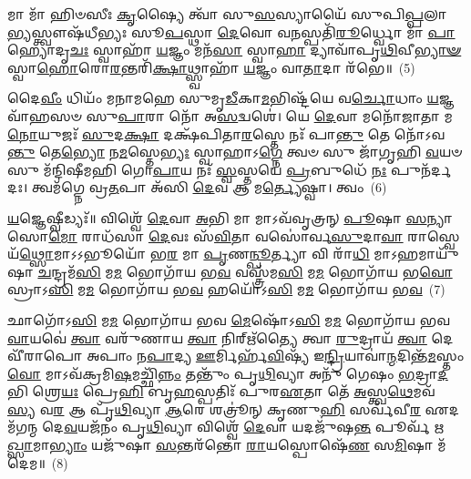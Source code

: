 𑌮𑌾 𑌮𑌾᳴ 𑌹𑌿𑍞𑌸𑍀𑌃 \ul{𑌕𑍃}\-𑌷𑍍𑌯𑍈 𑌤𑍍𑌵𑌾᳴ 𑌸𑍁\-\ul{𑌸}\-𑌸𑍍𑌯𑌾𑌯𑍈᳴ 𑌸𑍁𑌪𑌿\-\ul{𑌪𑍍𑌪}\-𑌲𑌾\-\ul{𑌭𑍍𑌯}\-𑌸𑍍𑌤𑍍𑌵𑍗𑌷᳴\-𑌧𑍀𑌭𑍍𑌯𑌃 𑌸𑍂\-\ul{𑌪}\-𑌸𑍍𑌥𑌾 \ul{𑌦𑍇}\-𑌵𑍋 𑌵\-\ul{𑌨}\-𑌸𑍍𑌪𑌤𑌿᳴\-\ul{𑌰𑍂}\-𑌰𑍍𑌧𑍍𑌵𑍋 𑌮𑌾᳴ \ul{𑌪𑌾}\-𑌹𑍍𑌯𑍋𑌦𑍃\-\ul{𑌚𑌃} 𑌸𑍍𑌵𑌾𑌹𑌾᳴ \ul{𑌯}\-𑌜𑍍𑌞𑌂 𑌮𑌨᳴\-\ul{𑌸𑌾} 𑌸𑍍𑌵𑌾\-\ul{𑌹𑌾} 𑌦𑍍𑌯𑌾𑌵𑌾᳴𑌪𑍃\-\ul{𑌥𑌿}\-𑌵𑍀\-\ul{𑌭𑍍𑌯𑌾}\-\-\ul{𑍟} 𑌸𑍍𑌵𑌾\-\ul{𑌹𑍋}\-𑌰𑍋\-\ul{𑌰}\-𑌨𑍍𑌤𑌰𑌿᳴\-\ul{𑌕𑍍𑌷𑌾}\-𑌥𑍍𑌸𑍍𑌵𑌾𑌹𑌾᳴ \ul{𑌯}\-𑌜𑍍𑌞𑌂 𑌵𑌾\-\ul{𑌤𑌾}\-𑌦𑌾 𑌰᳴𑌭𑍇॥~(5)

{\anuvakamend[{\-\ul{𑌮𑌾} 𑌯𑍋𑌨𑌿᳴𑌰𑌸𑌿 \ul{𑌤𑍍𑌰𑌿}\-\-\ul{𑍞}\-𑌶𑌚𑍍𑌚᳴}]}%

𑌦𑍈\-\ul{𑌵𑍀𑌂} 𑌧𑌿𑌯𑌂᳴ 𑌮𑌨𑌾𑌮𑌹𑍇 𑌸𑍁𑌮𑍃\-\ul{𑌡𑍀}\-𑌕𑌾\-\ul{𑌮}\-𑌭𑌿𑌷𑍍𑌟᳴𑌯𑍇 𑌵\-\ul{𑌰𑍍𑌚𑍋}\-𑌧𑌾𑌂 \ul{𑌯}\-𑌜𑍍𑌞𑌵𑌾᳴𑌹𑌸𑍞 𑌸𑍁\-\ul{𑌪𑌾}\-𑌰𑌾 𑌨𑍋᳴ 𑌅\-\ul{𑌸}\-𑌦𑍍𑌵𑌶𑍇॑। 𑌯𑍇 \ul{𑌦𑍇}\-𑌵𑌾 𑌮𑌨𑍋᳴𑌜𑌾𑌤𑌾 𑌮\-\ul{𑌨𑍋}\-𑌯𑍁𑌜𑌃᳴ \ul{𑌸𑍁}\-𑌦\-\ul{𑌕𑍍𑌷𑌾} 𑌦𑌕𑍍𑌷᳴𑌪𑌿𑌤𑌾\-\ul{𑌰}\-𑌸𑍍𑌤𑍇 𑌨𑌃᳴ 𑌪𑌾\-\ul{𑌨𑍍𑌤𑍁} 𑌤𑍇 𑌨𑍋᳴\-𑌽𑌵\-\ul{𑌨𑍍𑌤𑍁} 𑌤𑍇\-\ul{𑌭𑍍𑌯𑍋} 𑌨\-\ul{𑌮}\-𑌸𑍍𑌤𑍇\-\ul{𑌭𑍍𑌯𑌃} 𑌸𑍍𑌵𑌾𑌹𑌾\-𑌽\-\ul{𑌗𑍍𑌨𑍇} 𑌤𑍍𑌵𑍞 𑌸𑍁 𑌜𑌾᳴𑌗𑍃𑌹𑌿 \ul{𑌵}\-𑌯𑍞 𑌸𑍁 𑌮᳴𑌨𑍍𑌦𑌿𑌷𑍀𑌮𑌹𑌿 𑌗𑍋\-\ul{𑌪𑌾}\-𑌯 𑌨𑌃᳴ \ul{𑌸𑍍𑌵}\-𑌸𑍍𑌤𑌯𑍇॑ \ul{𑌪𑍍𑌰}\-𑌬𑍁𑌧𑍇᳴ \ul{𑌨𑌃} 𑌪𑍁𑌨᳴𑌰𑍍𑌦𑌦𑌃। 𑌤𑍍𑌵𑌮᳴𑌗𑍍𑌨𑍇 𑌵𑍍𑌰\-\ul{𑌤}\-𑌪𑌾 𑌅᳴𑌸𑌿 \ul{𑌦𑍇}\-𑌵 𑌆 𑌮\-\ul{𑌰𑍍𑌤𑍍𑌯𑍇}\-𑌷𑍍𑌵𑌾। 𑌤𑍍𑌵𑌂~(6)

\-\ul{𑌯}\-𑌜𑍍𑌞𑍇𑌷𑍍𑌵𑍀𑌡𑍍𑌯𑌃᳴॥ 𑌵𑌿𑌶𑍍𑌵𑍇᳴ \ul{𑌦𑍇}\-𑌵𑌾 \ul{𑌅}\-𑌭𑌿 𑌮𑌾 𑌮𑌾\-𑌽𑌵᳴𑌵𑍃𑌤𑍍𑌰𑌨𑍍 \ul{𑌪𑍂}\-𑌷𑌾 \ul{𑌸}\-𑌨𑍍𑌯𑌾 𑌸𑍋\-\ul{𑌮𑍋} 𑌰𑌾𑌧᳴𑌸𑌾 \ul{𑌦𑍇}\-𑌵𑌃 𑌸᳴\-\ul{𑌵𑌿}\-𑌤𑌾 𑌵𑌸𑍋॑𑌰𑍍𑌵\-\ul{𑌸𑍁}\-𑌦𑌾\-\ul{𑌵𑌾} 𑌰𑌾𑌸𑍍𑌵𑍇𑌯᳴\-\ul{𑌥𑍍𑌸𑍋}\-𑌮𑌾\-𑌽\-𑌽𑌭𑍂𑌯𑍋᳴ 𑌭\-\ul{𑌰} 𑌮𑌾 \ul{𑌪𑍃}\-𑌣\-\ul{𑌨𑍍𑌪𑍂}\-𑌰𑍍𑌤𑍍𑌯𑌾 𑌵𑌿 𑌰𑌾᳴\-\ul{𑌧𑌿} 𑌮𑌾\-𑌽𑌹𑌮𑌾𑌯𑍁᳴𑌷𑌾 \ul{𑌚}\-𑌨𑍍𑌦𑍍𑌰𑌮᳴\-\ul{𑌸𑌿} 𑌮\-\ul{𑌮} 𑌭𑍋𑌗𑌾᳴𑌯 𑌭\-\ul{𑌵} 𑌵𑌸𑍍𑌤𑍍𑌰᳴𑌮\-\ul{𑌸𑌿} 𑌮\-\ul{𑌮} 𑌭𑍋𑌗𑌾᳴𑌯 𑌭\-\ul{𑌵𑍋}\-𑌸𑍍𑌰𑌾\-𑌽\-\ul{𑌸𑌿} 𑌮\-\ul{𑌮} 𑌭𑍋𑌗𑌾᳴𑌯 𑌭\-\ul{𑌵} 𑌹𑌯𑍋᳴\-𑌽\-\ul{𑌸𑌿} 𑌮\-\ul{𑌮} 𑌭𑍋𑌗𑌾᳴𑌯 𑌭\-\ul{𑌵}\-~(7)

𑌛𑌾𑌗𑍋᳴\-𑌽\-\ul{𑌸𑌿} 𑌮\-\ul{𑌮} 𑌭𑍋𑌗𑌾᳴𑌯 𑌭𑌵 \ul{𑌮𑍇}\-𑌷𑍋᳴\-𑌽\-\ul{𑌸𑌿} 𑌮\-\ul{𑌮} 𑌭𑍋𑌗𑌾᳴𑌯 𑌭𑌵 \ul{𑌵𑌾}\-𑌯𑌵𑍇॑ \ul{𑌤𑍍𑌵𑌾} 𑌵𑌰𑍁᳴𑌣𑌾𑌯 \ul{𑌤𑍍𑌵𑌾} 𑌨𑌿𑌰𑍍\mbox{}𑌋᳴𑌤𑍍𑌯𑍈 𑌤𑍍𑌵𑌾 \ul{𑌰𑍁}\-𑌦𑍍𑌰𑌾𑌯᳴ \ul{𑌤𑍍𑌵𑌾} 𑌦𑍇𑌵𑍀᳴𑌰𑌾𑌪𑍋 𑌅𑌪𑌾𑌂 𑌨\-\ul{𑌪𑌾}\-𑌦𑍍𑌯 \ul{𑌊}\-𑌰𑍍𑌮𑌿𑌰𑍍\mbox{}𑌹᳴\-\ul{𑌵𑌿}\-𑌷𑍍𑌯᳴ 𑌇\-\ul{𑌨𑍍𑌦𑍍𑌰𑌿}\-𑌯𑌾𑌵𑌾॑\-\ul{𑌨𑍍𑌮}\-𑌦𑌿𑌨𑍍𑌤᳴\-\ul{𑌮}\-𑌸𑍍𑌤𑌂 \ul{𑌵𑍋} 𑌮𑌾\-𑌽𑌵᳴𑌕𑍍𑌰𑌮𑌿\-\ul{𑌷}\-𑌮𑌚𑍍𑌛𑌿᳴\-\ul{𑌨𑍍𑌨𑌂} 𑌤𑌨𑍍𑌤𑍁𑌂᳴ 𑌪𑍃\-\ul{𑌥𑌿}\-𑌵𑍍𑌯𑌾 𑌅𑌨𑍁᳴ 𑌗𑍇𑌷𑌂 \ul{𑌭}\-𑌦𑍍𑌰𑌾\-\ul{𑌦}\-𑌭𑌿 𑌶𑍍𑌰𑍇\-\ul{𑌯𑌃} 𑌪𑍍𑌰𑍇\-\ul{𑌹𑌿} 𑌬𑍃\-\ul{𑌹}\-𑌸𑍍𑌪𑌤𑌿𑌃᳴ 𑌪𑍁𑌰\-\ul{𑌏}\-𑌤𑌾 𑌤𑍇᳴ \ul{𑌅}\-𑌸𑍍𑌤𑍍𑌵\-\ul{𑌥𑍇}\-𑌮𑌵᳴ \ul{𑌸𑍍𑌯} 𑌵\-\ul{𑌰} 𑌆 𑌪𑍃᳴\-\ul{𑌥𑌿}\-𑌵𑍍𑌯𑌾 \ul{𑌆}\-𑌰𑍇 𑌶𑌤𑍍𑌰𑍂॑𑌨𑍍 𑌕𑍃𑌣𑍁\-\ul{𑌹𑌿} 𑌸𑌰𑍍𑌵᳴𑌵𑍀\-\ul{𑌰} 𑌏𑌦𑌮᳴𑌗𑌨𑍍𑌮 𑌦𑍇\-\ul{𑌵}\-𑌯𑌜᳴𑌨𑌂 𑌪𑍃\-\ul{𑌥𑌿}\-𑌵𑍍𑌯𑌾 𑌵𑌿𑌶𑍍𑌵𑍇᳴ \ul{𑌦𑍇}\-𑌵𑌾 𑌯𑌦𑌜𑍁᳴𑌷\-\ul{𑌨𑍍𑌤} 𑌪𑍂𑌰𑍍𑌵᳴ 𑌋\-\ul{𑌖𑍍𑌸𑌾}\-𑌮𑌾\-\ul{𑌭𑍍𑌯𑌾𑌂} 𑌯𑌜𑍁᳴𑌷𑌾 \ul{𑌸}\-𑌨𑍍𑌤𑌰᳴𑌨𑍍𑌤𑍋 \ul{𑌰𑌾}\-𑌯𑌸𑍍𑌪𑍋𑌷𑍇᳴\-\ul{𑌣} 𑌸\-\ul{𑌮𑌿}\-𑌷𑌾 𑌮᳴𑌦𑍇𑌮॥~(8)

{\anuvakamend[{𑌆 𑌤𑍍𑌵𑍞 𑌹𑌯𑍋᳴\-𑌽\-\ul{𑌸𑌿} 𑌮\-\ul{𑌮} 𑌭𑍋𑌗𑌾᳴𑌯 𑌭𑌵 \ul{𑌸𑍍𑌯} 𑌪𑌞𑍍𑌚᳴𑌵𑌿𑍞𑌶𑌤𑌿𑌶𑍍𑌚}]}%

